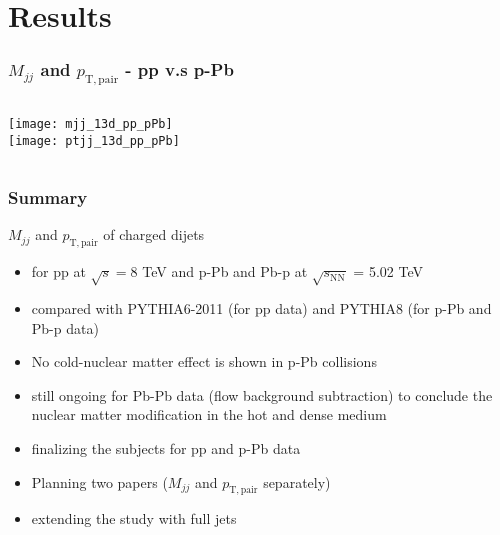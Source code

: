 


\section{Results}


\begin{frame}
\frametitle{$M_{jj}$ and $p_\mathrm{T,pair}$ - pp v.s p-Pb }

\begin{columns}[t]
\centering
\texttt{[image: mjj\_13d\_pp\_pPb]}\\
\texttt{[image: ptjj\_13d\_pp\_pPb]}\\
\end{columns}
\end{frame}



\begin{frame}
\frametitle{Summary}
$M_{jj}$ and $p_\mathrm{T,pair}$  of charged dijets 
\begin{itemize}
	\item for pp at $\sqrt{s} = 8$ TeV and p-Pb and Pb-p at $\sqrt{s_\mathrm{NN}}$ = 5.02 TeV 
	\item compared with PYTHIA6-2011 (for pp data) and PYTHIA8 (for p-Pb and Pb-p data)
	\item No cold-nuclear matter effect is shown in p-Pb collisions
	\item still ongoing for Pb-Pb data (flow background subtraction) to conclude the nuclear matter modification in the hot and dense medium
	\item finalizing the subjects for pp and p-Pb data
	\item Planning two papers ($M_{jj}$ and  $p_\mathrm{T,pair}$ separately) 
	\item extending the study with full jets
\end{itemize}

\end{frame}






